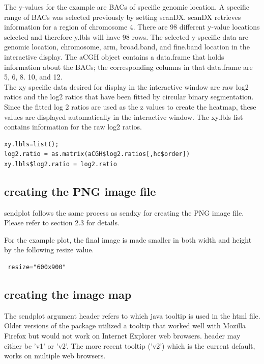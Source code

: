 \documentclass[]{article}
\begin{document}
\indent The y-values for the example are BACs of specific genomic location. A specific range of BACs was selected previously by setting scanDX. scanDX retrieves information for a region of chromosome 4.  There are 98 different y-value locations selected and therefore y.lbls will have 98 rows. The selected y-specific data are genomic location, chromosome, arm, broad.band, and fine.band location in the interactive display. The aCGH object contains a data.frame that holds information about the BACs; the corresponding columns in that data.frame are 5, 6, 8. 10, and 12. \\

\indent The xy specific data desired for display in the interactive window are raw log2 ratios and the log2 ratios that have been fitted by circular binary segmentation. Since the fitted log 2 ratios are used as the z values to create the heatmap, these values are displayed automatically in the interactive window. The xy.lbls list contains information for the raw log2 ratios. 

\begin{verbatim}
xy.lbls=list();
log2.ratio = as.matrix(aCGH$log2.ratios[,hc$order])
xy.lbls$log2.ratio = log2.ratio
\end{verbatim}



\subsection{creating the PNG image file}

\indent sendplot follows the same process as sendxy for creating the PNG image file. Please refer to section 2.3 for details.

 For the example plot, the final image is made smaller in both width and height by the following resize value. \newline

\begin{verbatim}
 resize="600x900"

\end{verbatim}



\subsection{creating the image map}

\indent The sendplot argument header refers to which java tooltip is used in the html file. Older versions of the package utilized a tooltip that worked well with Mozilla Firefox but would not work on Internet Explorer web browsers. header may either be 'v1' or 'v2'. The more recent tooltip ('v2') which is the current default, works on multiple web browsers.\\
\end{document}
